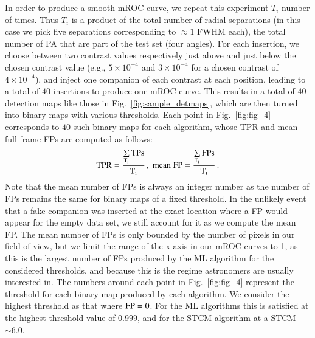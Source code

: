 \documentclass{aa}
\begin{document}
In order to produce a smooth mROC curve, we repeat this experiment $T_{i}$ number of times.
Thus $T_{i}$ is a product of the total number of radial separations (in this case we pick five separations corresponding to $\approx 1$ FWHM each), the total number of PA that are part of the test set (four angles).
For each insertion, we choose between two contrast values respectively just above and just below the chosen contrast value (e.g., $5\times10^{-4}$ and $3\times10^{-4}$ for a chosen contrast of $4\times10^{-4}$), and inject one companion of each contrast at each position, leading to a total of $40$ insertions to produce one mROC curve.
This results in a total of $40$ detection maps like those in Fig.~\ref{fig:sample_detmaps}, which are then turned into binary maps with various thresholds. 
Each point in Fig.~\ref{fig:fig_4} corresponds to $40$ such binary maps for each algorithm, whose TPR and mean full frame FPs are computed as follows:
\begin{equation}
\rm{TPR} =\dfrac{\sum\limits_{T_i}\rm{TPs}}{T_i} \, , \; 
\rm{mean\; FP} = \dfrac{\sum\limits_{T_i}FPs}{T_i} \, .
\label{eq:TPR}
\end{equation}
Note that the mean number of FPs is always an integer number as the number of FPs remains the same for binary maps of a fixed threshold.
In the unlikely event that a fake companion was inserted at the exact location where a FP would appear for the empty data set, we still account for it as we compute the mean FP. The mean number of FPs is only bounded by the number of pixels in our field-of-view, but we limit the range of the x-axis in our mROC curves to 1, as this is the largest number of FPs produced by the ML algorithm for the considered thresholds, and because this is the regime astronomers are usually interested in.
The numbers around each point in Fig.~\ref{fig:fig_4} represent the threshold for each binary map produced by each algorithm.
We consider the highest threshold as that where ${\rm FP} = 0$.
For the ML algorithms this is satisfied at the highest threshold value of $0.999$, and for the STCM algorithm at a STCM $\sim 6.0$. 
\end{document}

